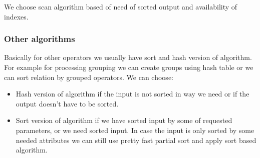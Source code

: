 We choose scan algorithm based of need of sorted output and availability of indexes.

\subsubsection{Other algorithms}

Basically for other operators we usually have sort and hash version of algorithm. For example for processing grouping we can create groups using hash table or we can sort relation by grouped operators. We can choose:

\begin{itemize}
\item Hash version of algorithm if the input is not sorted in way we need or if the output doesn't have to be sorted.

\item Sort version of algorithm if we have sorted input by some of requested parameters, or we need sorted input. In case the input is only sorted by some needed attributes we can still use pretty fast partial sort and apply sort based algorithm.

\end{itemize}